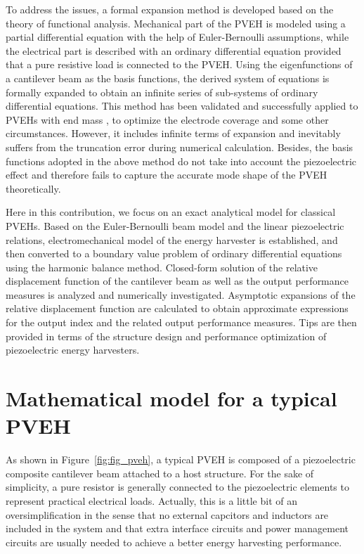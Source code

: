 \documentclass{svjour3}                     %
\begin{document}
To address the issues, a formal expansion method is developed based on the theory of functional analysis. \cite{kreyszig1978introductory} Mechanical part of the PVEH is modeled using a partial differential equation with the help of Euler-Bernoulli assumptions, while the electrical part is described with an ordinary differential equation provided that a pure resistive load is connected to the PVEH. \cite{erturk2008distributed} Using the eigenfunctions of a cantilever beam as the basis functions, the derived system of equations is formally expanded to obtain an infinite series of sub-systems of ordinary differential equations. This method has been validated and successfully applied to PVEHs with end mass \cite{erturk2009experimentally}, to optimize the electrode coverage \cite{erturk2009effect} and some other circumstances. However, it includes infinite terms of expansion and inevitably suffers from the truncation error during numerical calculation. Besides, the basis functions adopted in the above method do not take into account the piezoelectric effect and therefore fails to capture the accurate mode shape of the PVEH theoretically. 

Here in this contribution, we focus on an exact analytical model for classical PVEHs. Based on the Euler-Bernoulli beam model and the linear piezoelectric relations, electromechanical model of the energy harvester is established, and then converted to a boundary value problem of ordinary differential equations using the harmonic balance method. Closed-form solution of the relative displacement function of the cantilever beam as well as the output performance measures is analyzed and numerically investigated. Asymptotic expansions of the relative displacement function are calculated to obtain approximate expressions for the output index and the related output performance measures. Tips are then provided in terms of the structure design and performance optimization of piezoelectric energy harvesters. 


\section{Mathematical model for a typical PVEH}

As shown in Figure~\ref{fig:fig_pveh}, a typical PVEH is composed of a piezoelectric composite cantilever beam attached to a host structure. For the sake of simplicity, a pure resistor is generally connected to the piezoelectric elements to represent practical electrical loads. Actually, this is a little bit of an oversimplification in the sense that no external capcitors and inductors are included in the system and that extra interface circuits and power management circuits are usually needed to achieve a better energy harvesting performance. \cite{shu2006analysis,shu2007improved,qiu2009comparison} 
\end{document}
